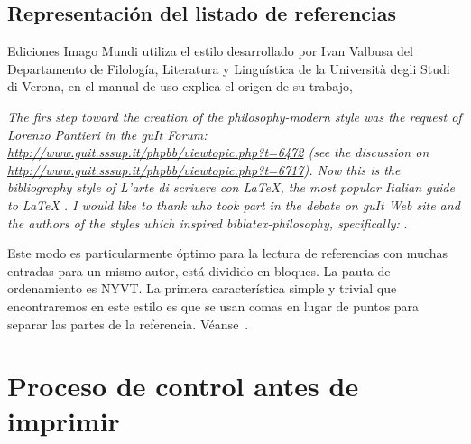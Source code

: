 \documentclass{book}
\begin{document}
{{{{{{{{\begin{mdframed}[linewidth=.5pt,linecolor=black!30,roundcorner=3pt,backgroundcolor=yellow!15]
\noindent\vspace{-12pt}\label{pagina18}
\printbibliography[annotation=true,keyword=nota-apunte,heading=none]
\end{mdframed}

\subsection{Representación del listado de referencias}

Ediciones Imago Mundi utiliza el estilo desarrollado por Ivan Valbusa del Departamento de Filología, Literatura y Linguística de la Università degli Studi di Verona, en el manual de uso explica el origen de su trabajo,

\begin{myquote}
\emph{The firs step toward the creation of the philosophy-modern style was the request of Lorenzo Pantieri in the guIt Forum: \emph{\url{http://www.guit.sssup.it/phpbb/viewtopic.php?t=6472}} (see the discussion on \emph{\url{http://www.guit.sssup.it/phpbb/viewtopic.php?t=6717}}). Now this is the bibliography style of \emph{L’arte di scrivere con LaTeX}, the most popular Italian guide to LaTeX \emph{\parencite{Pantieri2011}}. I would like to thank who took part in the debate on guIt Web site and the authors of the styles which inspired biblatex-philosophy, specifically:} \textcite{Gliboff2010,Clawson2010,Wassenhoven2011} \parencite{Valbusa2009}.
\end{myquote}

Este modo es particularmente óptimo para la lectura de referencias con muchas entradas para un mismo autor, está dividido en bloques. La pauta de ordenamiento es NYVT. La primera característica simple y trivial que encontraremos en este estilo es que se usan comas en lugar de puntos para separar las partes de la referencia. Véanse~\textcite{Knuth1984,Knuth1984a,Knuth1986,Knuth1986a,Knuth1986b,Knuth1986c}.

\begin{mdframed}[linewidth=.5pt,linecolor=black!30,roundcorner=3pt,backgroundcolor=yellow!15]
\noindent\vspace{-12pt}
\printbibliography[keyword=knutH,heading=none]
\end{mdframed}

\section{Proceso de control antes de imprimir}

}}}}}}}}
\end{document}
